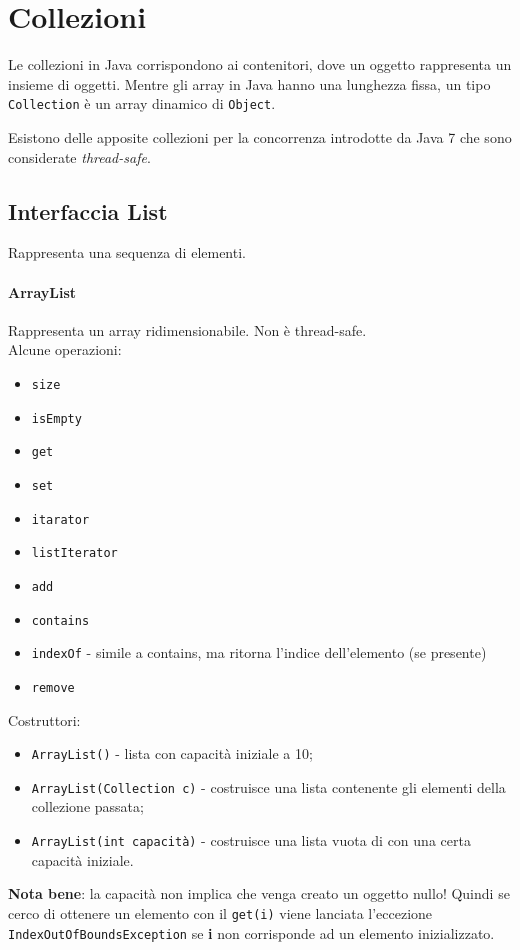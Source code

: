 \section{Collezioni}
Le collezioni in Java corrispondono ai contenitori, dove un oggetto rappresenta un insieme di oggetti. Mentre gli array in Java hanno una lunghezza fissa, un tipo \texttt{Collection} è un array dinamico di \texttt{Object}.

Esistono delle apposite collezioni per la concorrenza introdotte da Java 7 che sono considerate \textit{thread-safe}.

\subsection{Interfaccia List}
Rappresenta una sequenza di elementi. 
\paragraph{ArrayList}
Rappresenta un array ridimensionabile. Non è thread-safe. \\ Alcune operazioni:
\begin{itemize}
\item \texttt{size}
\item \texttt{isEmpty}
\item \texttt{get}
\item \texttt{set}
\item \texttt{itarator}
\item \texttt{listIterator}
\item \texttt{add}
\item \texttt{contains}
\item \texttt{indexOf} - simile a contains, ma ritorna l'indice dell'elemento (se presente)
\item \texttt{remove}
\end{itemize}
Costruttori:
\begin{itemize}
\item \texttt{ArrayList()} - lista con capacità iniziale a 10;
\item \texttt{ArrayList(Collection c)} - costruisce una lista contenente gli elementi della collezione passata;
\item \texttt{ArrayList(int capacità)} - costruisce una lista vuota di con una certa capacità iniziale.
\end{itemize}
\textbf{Nota bene}: la capacità non implica che venga creato un oggetto nullo! Quindi se cerco di ottenere un elemento con il \texttt{get(i)} viene lanciata l'eccezione \texttt{IndexOutOfBoundsException} se \textbf{i} non corrisponde ad un elemento inizializzato.

